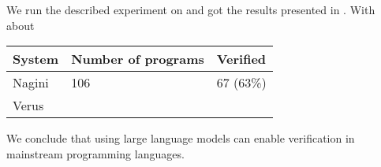 
We run the described experiment on  and got the results presented in . 
With about 

\begin{table}[]
  \begin{tabular}{l|l|l}
  System & Number of programs & Verified  \\ \hline
  Nagini & 106                & 67 (63\%) \\
  Verus  &                    &          
  \end{tabular}
  \end{table}

We conclude that using large language models can enable verification in mainstream programming languages. 



